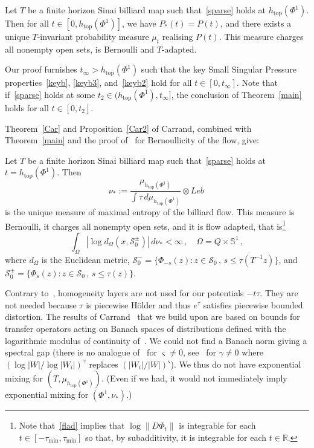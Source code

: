 \documentclass[AHL,Unicode,longabstracts,published]{cedram}
\newcommand{\cS}{\mathcal{S}}
\newcommand{\bbR}{\mathbb{R}}
\newcommand{\bbS}{\mathbb{S}}
\newcommand{\htop}{h_{\scriptstyle{\text{top}}}}
\newcommand{\htop}{h_{\scriptstyle{\text{top}}}}
\begin{document}
\begin{theo}\label{main}
Let $T$ be a finite horizon Sinai billiard map such that~\eqref{sparse} holds at $\htop(\Phi^1)$. Then for all $t\in[0, \htop(\Phi^1)]$, we have $P_*(t)=P(t)$, and there exists a unique $T$-invariant probability measure $\mu_t$ realising $P(t)$. This measure charges all nonempty open sets, is Bernoulli and $T$-adapted.
\end{theo}

Our proof furnishes $t_\infty> \htop(\Phi^1) $ such that the key Small Singular Pressure properties~\eqref{keyb}, \eqref{keyb3}, and~\eqref{keyb2} hold for all $t\in[0, t_\infty]$. Note that if~\eqref{sparse} holds at some $t_2\in (\htop(\Phi^1), t_\infty]$, the conclusion of Theorem~\ref{main} holds for all $t\in [0,t_2]$.

Theorem~\ref{Car} and Proposition~\ref{Car2} of Carrand, combined with Theorem~\ref{main} and the proof of~\cite[Propositions~7.1 and~7.2]{Ca} for Bernoullicity of the flow, give:



\begin{coro}\label{cormain}
Let $T$ be a finite horizon Sinai billiard map such that~\eqref{sparse} holds at $t=\htop(\Phi^1)$. Then
\[
\nu_*:=\frac{\mu_{\htop(\Phi^1)}}{\int \tau \, d \mu_{\htop(\Phi^1)}} \otimes Leb\,
\]
is the unique measure of maximal entropy of the billiard flow. This measure is Bernoulli, it charges all nonempty open sets, and it is flow adapted, that is\footnote{Note that~\eqref{flad} implies that $\log \| D\Phi_t \|$ is integrable for each $t \in [-\tau_{\min}, \tau_{\min}]$ so that, by subadditivity, it is integrable for each $t \in \bbR$.}
\begin{equation}\label{flad}
\int_\Omega \left|\log d_\Omega(x, \cS_0^\pm)\right| \, d\nu_{*} <\infty\,,\quad
\Omega = Q \times \bbS^1
\,,
\end{equation}
where $d_\Omega$ is the Euclidean metric, $
\cS_0^- = \{ \Phi_{-s}(z) : z \in \cS_0 \,,\, s \le \tau(T^{-1}z) \}$, and $ \cS_0^+ = \{ \Phi_s(z) : z \in \cS_0 \,,\, s \le \tau(z) \}$.
\end{coro}




Contrary to~\cite{BD2}, homogeneity layers are not used for our potentials $-t\tau$. They are not needed because $\tau$ is piecewise H\"older and thus $e^\tau$ satisfies piecewise bounded distortion. The results of Carrand~\cite{Ca} that we build upon are based on bounds for transfer operators acting on Banach spaces of distributions defined with the logarithmic modulus of continuity of~\cite{BD1}. We could not find a Banach norm giving a spectral gap (there is no analogue of~\cite[Lemmas~3.3 and~3.4]{BD2} for $\varsigma\ne 0$, see~\cite[Lemma~3.1]{Ca} for $\gamma\ne 0$ where $(\log |W|/\log|W_i|)^\gamma$ replaces $(|W_i|/|W|)^\varsigma$). We thus do not have exponential mixing for $(T,\mu_{\htop(\Phi^1)})$. (Even if we had, it would not immediately imply exponential mixing for $(\Phi^1,\nu_*)$.)
\end{document}
